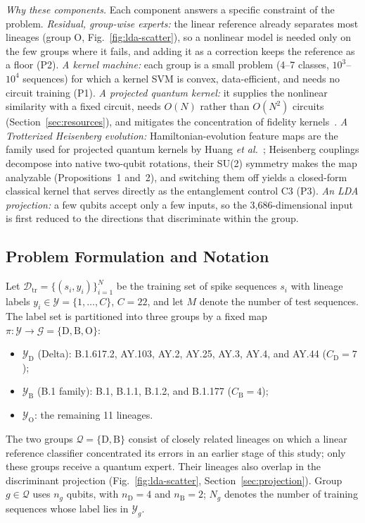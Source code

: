 \documentclass[conference]{IEEEtran}
\begin{document}
\textit{Why these components.} Each component answers a specific constraint of the problem. \emph{Residual, group-wise experts:} the linear reference already separates most lineages (group O, Fig.~\ref{fig:lda-scatter}), so a nonlinear model is needed only on the few groups where it fails, and adding it as a correction keeps the reference as a floor (P2). \emph{A kernel machine:} each group is a small problem (4--7 classes, $10^3$--$10^4$ sequences) for which a kernel SVM is convex, data-efficient, and needs no circuit training (P1). \emph{A projected quantum kernel:} it supplies the nonlinear similarity with a fixed circuit, needs $O(N)$ rather than $O(N^2)$ circuits (Section~\ref{sec:resources}), and mitigates the concentration of fidelity kernels~\cite{huang2021power}. \emph{A Trotterized Heisenberg evolution:} Hamiltonian-evolution feature maps are the family used for projected quantum kernels by Huang \textit{et al.}~\cite{huang2021power}; Heisenberg couplings decompose into native two-qubit rotations, their SU(2) symmetry makes the map analyzable (Propositions~1 and~2), and switching them off yields a closed-form classical kernel that serves directly as the entanglement control C3 (P3). \emph{An LDA projection:} a few qubits accept only a few inputs, so the 3,686-dimensional input is first reduced to the directions that discriminate within the group.

\subsection{Problem Formulation and Notation}
\label{sec:formulation}

Let $\mathcal{D}_{\mathrm{tr}}=\{(s_i,y_i)\}_{i=1}^{N}$ be the training set of spike sequences $s_i$ with lineage labels $y_i\in\mathcal{Y}=\{1,\dots,C\}$, $C=22$, and let $M$ denote the number of test sequences. The label set is partitioned into three groups by a fixed map $\pi:\mathcal{Y}\to\mathcal{G}=\{\mathrm{D},\mathrm{B},\mathrm{O}\}$:
\begin{itemize}
    \item $\mathcal{Y}_{\mathrm{D}}$ (Delta): B.1.617.2, AY.103, AY.2, AY.25, AY.3, AY.4, and AY.44 ($C_{\mathrm{D}}=7$);
    \item $\mathcal{Y}_{\mathrm{B}}$ (B.1 family): B.1, B.1.1, B.1.2, and B.1.177 ($C_{\mathrm{B}}=4$);
    \item $\mathcal{Y}_{\mathrm{O}}$: the remaining 11 lineages.
\end{itemize}
The two groups $\mathcal{Q}=\{\mathrm{D},\mathrm{B}\}$ consist of closely related lineages on which a linear reference classifier concentrated its errors in an earlier stage of this study; only these groups receive a quantum expert. Their lineages also overlap in the discriminant projection (Fig.~\ref{fig:lda-scatter}, Section~\ref{sec:projection}). Group $g\in\mathcal{Q}$ uses $n_g$ qubits, with $n_{\mathrm{D}}=4$ and $n_{\mathrm{B}}=2$; $N_g$ denotes the number of training sequences whose label lies in $\mathcal{Y}_g$.
\end{document}
